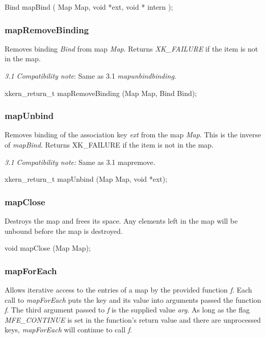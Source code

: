 {\sem Bind} {\bold mapBind} 
(
{\sem Map} {\caps Map}, 
{\sem void} *{\caps ext}, 
{\sem void *} {\caps intern}
);

\subsubsection{mapRemoveBinding}

Removes binding {\em Bind} from map {\em Map}.  Returns {\em
XK\_FAILURE} if the item is not in the map.
\medskip

{\em 3.1 Compatibility note}:  Same as 3.1 {\em mapunbindbinding}.
\medskip

{\sem xkern\_return\_t} {\bold mapRemoveBinding} ({\sem Map} {\caps Map}, {\sem Bind} {\caps Bind});

\subsubsection{mapUnbind}

Removes binding of the association key {\em ext} from the map {\em
Map}.  This is the inverse of {\em mapBind}.  
Returns XK\_FAILURE if the item is not in the map.
\medskip

{\em 3.1 Compatibility note:}  Same as 3.1 mapremove.
\medskip

{\sem xkern\_return\_t} {\bold mapUnbind} ({\sem Map} {\caps Map},  {\sem void } *{\caps ext});

\subsubsection{mapClose}

Destroys the map and frees its space.  Any elements left in the
map will be unbound before the map is destroyed.
\medskip

{\sem void} {\bold mapClose} ({\sem Map} {\caps Map});

\subsubsection{mapForEach}

Allows iterative access to the entries of a map by the provided
function {\em f}.  Each call to {\em mapForEach} puts the key and its
value into arguments passed the function {\em f}.  The third argument
passed to {\em f} is the supplied value {\em arg}.  As long as the
flag {\em MFE\_CONTINUE} is set in the function's return value
and there are unprocessed keys, {\em mapForEach}
will continue to call {\em f}.

